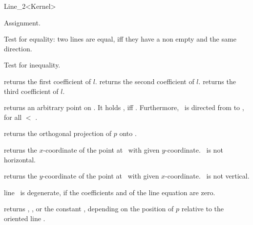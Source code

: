 \begin{ccRefClass} {Line_2<Kernel>}
\ccOperations


\ccHidden {}
        {Assignment.}

       {Test for equality: two lines are equal, iff they have a non 
        empty  and the same direction.}

       {Test for inequality.}


       {returns the first coefficient of $l$.}
\ccGlue
{}
       {returns the second coefficient of $l$.}
\ccGlue
{}
       {returns the third coefficient of $l$.}

       {returns an arbitrary point on \ccVar. It holds 
        , iff .
        Furthermore, \ccVar\ is directed from 
        to , for all  $<$ .}

       {returns the orthogonal projection of $p$ onto \ccVar.}

       {returns the $x$-coordinate of the point at \ccVar\ with
        given $y$-coordinate.
        \ccPrecond \ccVar\ is not horizontal.}

       {returns the $y$-coordinate of the point at \ccVar\ with
        given $x$-coordinate.
        \ccPrecond \ccVar\ is not vertical.}


       {line \ccVar\ is degenerate, if the coefficients  and 
         of the line equation are zero.}

       {}
\ccGlue
{}
       {}

       {returns ,
        , or the constant
        ,
        depending on the position of $p$  relative to the oriented line \ccVar.
        }



\end{ccRefClass}
